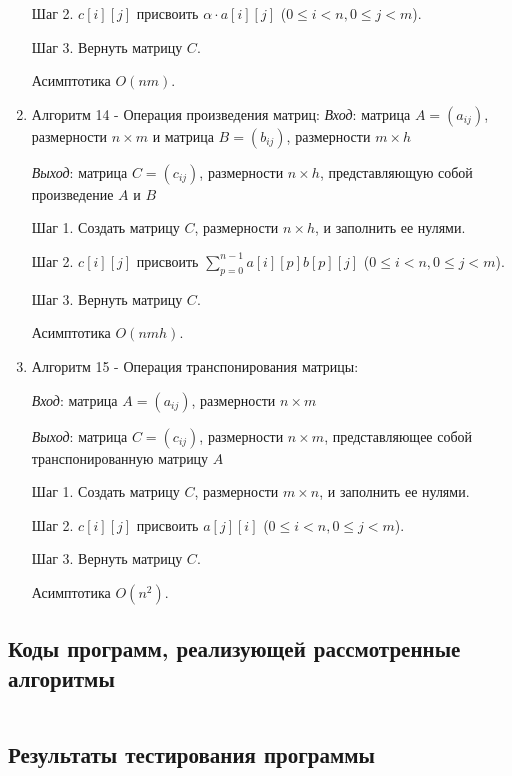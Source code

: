 \documentclass[spec, och, labwork]{shiza}
\begin{document}
\begin{enumerate}
                Шаг 2. $c[i][j]$ присвоить $\alpha \cdot a[i][j]$ ($0 \leq i < n, 0 \leq j < m$).

                Шаг 3. Вернуть матрицу $C$.

                Асимптотика $O(nm)$.

                \item Алгоритм 14 - Операция произведения матриц:
                \textit{Вход}: матрица $A = (a_{ij})$, размерности $n \times m$ и матрица $B = (b_{ij})$, размерности $m \times h$

                \textit{Выход}: матрица $C = (c_{ij})$, размерности $n \times h$, представляющую собой произведение $A$ и $B$

                Шаг 1. Создать матрицу $C$, размерности $n \times h$, и заполнить ее нулями.

                Шаг 2. $c[i][j]$ присвоить $\sum\limits_{p=0}^{n-1} a[i][p]b[p][j]$ ($0 \leq i < n, 0 \leq j < m$).

                Шаг 3. Вернуть матрицу $C$.

                Асимптотика $O(nmh)$.

                \item Алгоритм 15 - Операция транспонирования матрицы:
                
                \textit{Вход}: матрица $A = (a_{ij})$, размерности $n \times m$

                \textit{Выход}: матрица $C = (c_{ij})$, размерности $n \times m$, представляющее собой транспонированную матрицу $A$

                Шаг 1. Создать матрицу $C$, размерности $m \times n$, и заполнить ее нулями.

                Шаг 2. $c[i][j]$ присвоить $a[j][i]$ ($0 \leq i < n, 0 \leq j < m$).

                Шаг 3. Вернуть матрицу $C$.

                Асимптотика $O(n^2)$.
            \end{enumerate}
            
\subsection{Коды программ, реализующей рассмотренные алгоритмы}

    \inputminted[fontsize=\small]{python}{../code/lab3.py}
    
\subsection{Результаты тестирования программы}
\end{document}
